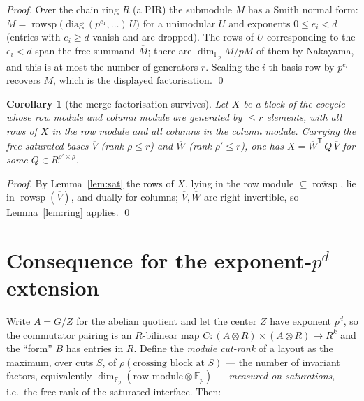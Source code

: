 \documentclass[11pt,a4paper]{article}
\theoremstyle{plain}
\newtheorem{corollary}[lemma]{Corollary}
\theoremstyle{definition}
\newcommand{\R}{R}
\newcommand{\rowsp}{\operatorname{rowsp}}
\newcommand{\sat}[1]{\overline{#1}}
\newcommand{\T}{^{\mathsf T}}
\newcommand{\Fp}{\mathbb{F}_p}
\begin{document}
\begin{proof}
Over the chain ring $\R$ (a PIR) the submodule $M$ has a Smith normal
form: $M=\rowsp\bigl(\operatorname{diag}(p^{e_1},\dots)\,U\bigr)$ for a
unimodular $U$ and exponents $0\le e_i<d$ (entries with $e_i\ge d$ vanish
and are dropped). The rows of $U$ corresponding to the $e_i<d$ span the
free summand $\sat M$; there are $\dim_{\Fp}M/pM$ of them by Nakayama, and
this is at most the number of generators $r$. Scaling the $i$-th basis
row by $p^{e_i}$ recovers $M$, which is the displayed factorisation. \qed
\end{proof}

\begin{corollary}[the merge factorisation survives]\label{cor:merge}
Let $X$ be a block of the cocycle whose row module and column module are
generated by $\le r$ elements, with all rows of $X$ in the row module and
all columns in the column module. Carrying the free saturated bases $\sat
V$ (rank $\rho\le r$) and $\sat W$ (rank $\rho'\le r$), one has
$X=\sat W\T\,Q\,\sat V$ for some $Q\in\R^{\rho'\times\rho}$.
\end{corollary}

\begin{proof}
By Lemma~\ref{lem:sat} the rows of $X$, lying in the row module
$\subseteq\sat{\rowsp}$, lie in $\rowsp(\sat V)$, and dually for columns;
$\sat V,\sat W$ are right-invertible, so Lemma~\ref{lem:ring} applies. \qed
\end{proof}

\section{Consequence for the exponent-$p^{d}$ extension}

Write $A=G/Z$ for the abelian quotient and let the center $Z$ have
exponent $p^{d}$, so the commutator pairing is an $\R$-bilinear map
$C\colon (A\otimes\R)\times(A\otimes\R)\to\R^{k}$ and the ``form'' $B$ has
entries in $\R$. Define the \emph{module cut-rank} of a layout as the
maximum, over cuts $S$, of $\rho(\text{crossing block at }S)$ --- the
number of invariant factors, equivalently $\dim_{\Fp}(\text{row
module}\otimes\Fp)$ --- \emph{measured on saturations}, i.e.\ the free
rank of the saturated interface. Then:
\end{document}

